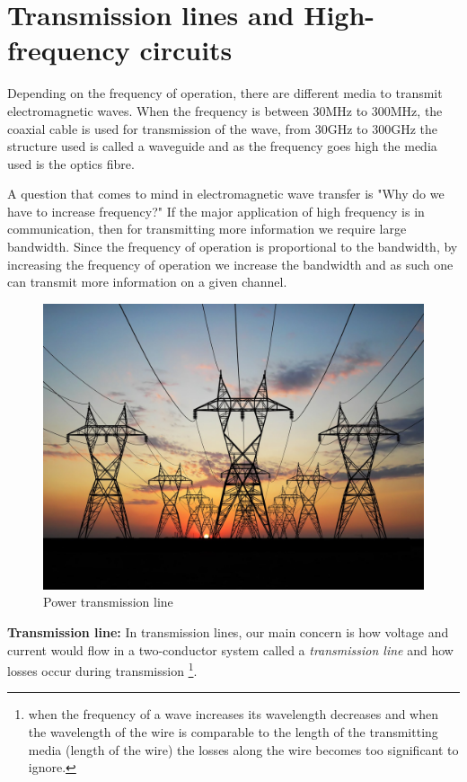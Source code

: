 \section{Transmission lines and High-frequency circuits}

Depending on the frequency of operation, there are different media to transmit electromagnetic waves. When the frequency is between 30MHz to 300MHz, the coaxial cable is used for transmission of the wave, from 30GHz to 300GHz the structure used is called a waveguide and as the frequency goes high the media used is the optics fibre.

A question that comes to mind in electromagnetic wave transfer is "Why do we have to increase frequency?" If the major application of high frequency is in communication, then for transmitting more information we require large bandwidth. Since the frequency of operation is proportional to the bandwidth, by increasing the frequency of operation we increase the bandwidth and as such one can transmit more information on a given channel.
\begin{figure}[h]
\centering
\includegraphics[scale=0.1]{./graphics/transmission2}
\caption{Power transmission line}
\end{figure}

\textbf{Transmission line:} In transmission lines, our main concern is how voltage and current would flow in a two-conductor system called a \textit{transmission line} and how losses occur during transmission \footnote{when the frequency of a wave increases its wavelength decreases and when the wavelength of the wire is comparable to the length of the transmitting media (length of the wire) the losses along the wire becomes too significant to ignore.}.

